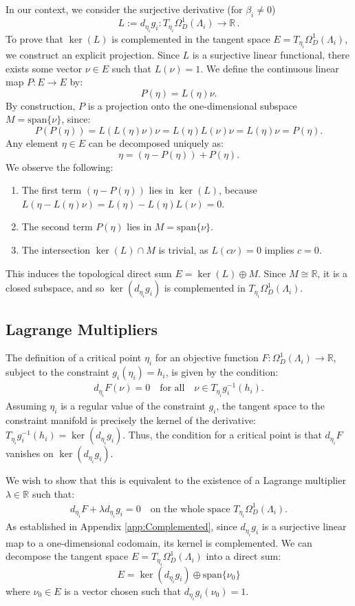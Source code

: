 \documentclass[11pt]{article}
\theoremstyle{plain}
\theoremstyle{definition}
\theoremstyle{remark}
\newcommand{\ST}{\Lambda}
\begin{document}
In our context, we consider the surjective derivative (for \(\beta_i \neq 0\))
\[ L := d_{\eta_i} g_i : T_{\eta_i} \Omega_D^1(\ST_i) \to \mathbb{R} \, . \]
To prove that $\ker(L)$ is complemented in the tangent space $E = T_{\eta_i} \Omega_D^1(\ST_i)$, we construct an explicit projection. Since $L$ is a surjective linear functional, there exists some vector $\nu \in E$ such that $L(\nu) = 1$. We define the continuous linear map $P: E \to E$ by:
\[ P(\eta) = L(\eta)\nu. \]
By construction, $P$ is a projection onto the one-dimensional subspace $M = \text{span}\{\nu\}$, since:
\[ P(P(\eta)) = L(L(\eta)\nu)\nu = L(\eta)L(\nu)\nu = L(\eta)\nu = P(\eta). \]
Any element $\eta \in E$ can be decomposed uniquely as:
\[ \eta = (\eta - P(\eta)) + P(\eta). \]
We observe the following:
\begin{enumerate}
    \item The first term $(\eta - P(\eta))$ lies in $\ker(L)$, because $L(\eta - L(\eta)\nu) = L(\eta) - L(\eta)L(\nu) = 0$.
    \item The second term $P(\eta)$ lies in $M = \text{span}\{\nu\}$.
    \item The intersection $\ker(L) \cap M$ is trivial, as $L(c\nu)  = 0$ implies $c=0$.
\end{enumerate}
This induces the topological direct sum $E = \ker(L) \oplus M$. Since $M \cong \mathbb{R}$, it is a closed subspace, and so $\ker(d_{\eta_i} g_i)$ is complemented in $T_{\eta_i} \Omega_D^1(\ST_i)$.




\subsection{Lagrange Multipliers}\label{app:LM}

The definition of a critical point $\eta_i$ for an objective function $F: \Omega_D^1(\ST_i) \to \mathbb{R}$, subject to the constraint $g_i(\eta_i) = h_i$, is given by the condition:
\begin{align*}
    d_{\eta_i} F(\nu) = 0 \quad \text{for all} \quad \nu \in T_{\eta_i} g_i^{-1}(h_i).
\end{align*}
Assuming $\eta_i$ is a regular value of the constraint $g_i$, the tangent space to the constraint manifold is precisely the kernel of the derivative: $T_{\eta_i} g_i^{-1}(h_i) = \ker(d_{\eta_i} g_i)$. Thus, the condition for a critical point is that $d_{\eta_i} F$ vanishes on $\ker(d_{\eta_i} g_i)$.

We wish to show that this is equivalent to the existence of a Lagrange multiplier $\lambda \in \mathbb{R}$ such that:
\begin{align*}
    d_{\eta_i} F + \lambda d_{\eta_i} g_i = 0 \quad \text{on the whole space } T_{\eta_i} \Omega_D^1(\ST_i).
\end{align*}
As established in Appendix \ref{app:Complemented}, since $d_{\eta_i} g_i$ is a surjective linear map to a one-dimensional codomain, its kernel is complemented. We can decompose the tangent space $E = T_{\eta_i} \Omega_D^1(\ST_i)$ into a direct sum:
\[ E = \ker(d_{\eta_i} g_i) \oplus \text{span}\{\nu_0\} \]
where $\nu_0 \in E$ is a vector chosen such that $d_{\eta_i} g_i(\nu_0) = 1$. 
\end{document}
